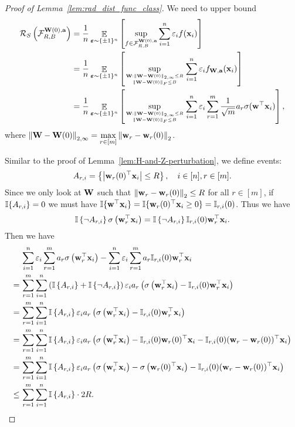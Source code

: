 \begin{proof}[Proof of Lemma~\ref{lem:rad_dist_func_class}]
	We need to upper bound
	\begin{align*}
		\mathcal{R}_S\left(\mathcal{F}^{\mathbf{W}(0),\mathbf{a}}_{R,B} \right) 
		&= \frac{1}{n} \mathop\mathbb{E}_{{\bm{\varepsilon}} \sim \{\pm 1\}^n }\left[ \sup_{f \in \mathcal{F}^{\mathbf{W}(0),\mathbf{a}}_{R,B}}\sum_{i=1}^{n} \varepsilon_i f(\mathbf{x}_i) \right] \\
		&= \frac{1}{n} \mathop\mathbb{E}_{{\bm{\varepsilon}} \sim \{\pm 1\}^n }\left[  \sup_{\mathbf{W}: \left\|\mathbf{W} - \mathbf{W}(0)\right\|_{2, \infty} \le R \atop \left\|\mathbf{W} - \mathbf{W}(0)\right\|_F \le B }\sum_{i=1}^{n} \varepsilon_i f_{\mathbf{W}, \mathbf{a}}(\mathbf{x}_i) \right] \\
		&= \frac{1}{n} \mathop\mathbb{E}_{{\bm{\varepsilon}} \sim \{\pm 1\}^n }\left[  \sup_{\mathbf{W}: \left\|\mathbf{W} - \mathbf{W}(0)\right\|_{2, \infty} \le R \atop \left\|\mathbf{W} - \mathbf{W}(0)\right\|_F \le B }\sum_{i=1}^{n} \varepsilon_i \sum_{r=1}^m \frac{1}{\sqrt m} a_r \sigma(\mathbf{w}^\top \mathbf{x}_i) \right] ,
	\end{align*}
where $\left\|\mathbf{W} - \mathbf{W}(0)\right\|_{2, \infty} = \max\limits_{r\in[m]} \left\|\mathbf{w}_r-\mathbf{w}_r(0)\right\|_2$.
	

Similar to the proof of Lemma~\ref{lem:H-and-Z-perturbation}, we define events:
\[A_{r, i} = \left\{ \left|\mathbf{w}_{r}(0)^\top \mathbf{x}_i\right| \le R \right\}, \quad i\in[n], r\in[m].\]
Since we only look at $\mathbf{W}$ such that $\left\|\mathbf{w}_r-\mathbf{w}_r(0)\right\|_2\le R$ for all $ r\in[m]$,
if $\mathbb{I}\{A_{r, i}\}=0$ we must have $\mathbb{I}\{ \mathbf{w}^\top \mathbf{x}_i \} = \mathbb{I}\{\mathbf{w}_r(0)^\top \mathbf{x}_i\ge  0\} = \mathbb{I}_{r, i}(0)$. Thus we have
\[ \bone{\neg A_{r, i}} \relu{\vw_r^\top \vx_i} %
=  \bone{\neg A_{r, i}} \indict_{r, i}(0)\vw_r^\top \vx_i. \]
Then we have
\begin{align*}
&\sum_{i=1}^n \varepsilon_i \sum_{r=1}^m a_r \sigma\left(\mathbf{w}_r^\top \mathbf{x}_i\right) -\sum_{i=1}^n \varepsilon_i \sum_{r=1}^m a_r \mathbb{I}_{r,i}(0) \mathbf{w}_r^\top \mathbf{x}_i   \\
=\,& \sum_{r=1}^m \sum_{i=1}^n \left( \mathbb{I}\left\{A_{r, i}\right\} + \mathbb{I}\left\{\neg A_{r, i}\right\}\right) \varepsilon_i a_r \left( \sigma\left(\mathbf{w}_r^\top \mathbf{x}_i\right) - \mathbb{I}_{r,i}(0) \mathbf{w}_r^\top \mathbf{x}_i   \right)\\
=\,& \sum_{r=1}^m \sum_{i=1}^n  \mathbb{I}\left\{A_{r, i}\right\}  \varepsilon_i a_r \left( \sigma\left(\mathbf{w}_r^\top \mathbf{x}_i\right) - \mathbb{I}_{r,i}(0) \mathbf{w}_r^\top \mathbf{x}_i   \right)\\
=\,& \sum_{r=1}^m \sum_{i=1}^n  \mathbb{I}\left\{A_{r, i}\right\}  \varepsilon_i a_r \left( \sigma\left(\mathbf{w}_r^\top \mathbf{x}_i\right) - \mathbb{I}_{r,i}(0) \mathbf{w}_r(0)^\top \mathbf{x}_i    - \mathbb{I}_{r,i}(0) (\mathbf{w}_r-\mathbf{w}_r(0))^\top \mathbf{x}_i  \right)\\
=\,& \sum_{r=1}^m \sum_{i=1}^n  \mathbb{I}\left\{A_{r, i}\right\}  \varepsilon_i a_r \left( \sigma\left(\mathbf{w}_r^\top \mathbf{x}_i\right) - \sigma\left(\mathbf{w}_r(0)^\top \mathbf{x}_i\right)   - \mathbb{I}_{r,i}(0) (\mathbf{w}_r-\mathbf{w}_r(0))^\top \mathbf{x}_i   \right)\\
\le\, & \sum_{r=1}^m \sum_{i=1}^n  \mathbb{I}\left\{A_{r, i}\right\} \cdot 2R  .
\end{align*}


\end{proof}
